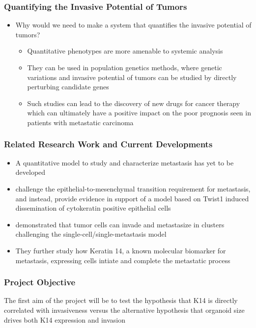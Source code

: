 \documentclass{beamer} %
\begin{document}
\begin{frame}
	\frametitle{Quantifying the Invasive Potential of Tumors}
	\begin{itemize}
		\item Why would we need to make a system that quantifies the invasive potential of tumors?
		\begin{itemize}
				\item Quantitative phenotypes are more amenable to systemic analysis
				\item They can be used in population genetics methods, where genetic variations and invasive potential of tumors can be studied by directly perturbing candidate genes
				\item Such studies can lead to the discovery of new drugs for cancer therapy which can ultimately have a positive impact on the poor prognosis seen in patients with metastatic carcinoma 		\end{itemize}
	\end{itemize}
\end{frame}

\begin{frame}
	\frametitle{Related Research Work and Current Developments}
	\begin{itemize}
			\item A quantitative model to study and characterize metastasis has yet to be developed
			\item \cite{shamir2014twist1} challenge the epithelial-to-mesenchymal transition requirement for metastasis, and instead, provide evidence in support of a model based on Twist1 induced dissemination of cytokeratin positive epithelial cells
			\item \cite{cheung2016polyclonal} demonstrated that tumor cells can invade and metastasize in clusters challenging the single-cell/single-metastasis model
			\item They further study how Keratin 14, a known molecular biomarker for metastasis, expressing cells intiate and complete the metastatic process 
	\end{itemize}
\end{frame}

\begin{frame}
	\frametitle{Project Objective}
		The first aim of the project will be to test the hypothesis that K14 is directly correlated with invasiveness versus the alternative hypothesis that organoid size drives both K14 expression and invasion 
\end{frame}
\end{document}
